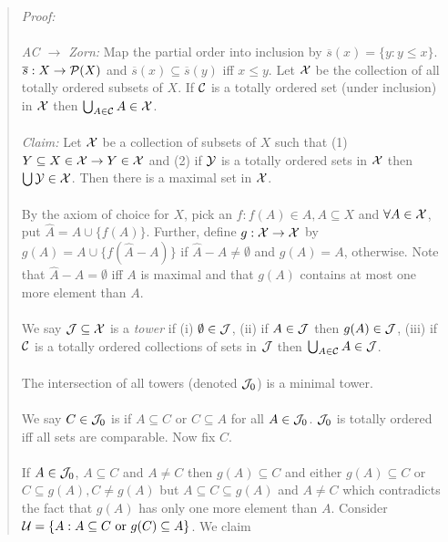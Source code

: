 \begin{quote}
\emph{Proof:}
\\
\\
\emph{AC $\rightarrow$ Zorn:}  Map the partial order into inclusion by
${\overline s}(x)= \{ y: y \leq x \}$.  ${\overline s}: X \rightarrow {\cal P}(X)$ and
${\overline s}(x) \subseteq {\overline s}(y)$ iff $x \leq y$.  Let ${\cal X}$ be the collection of
all totally ordered subsets of $X$.  If ${\cal C}$ is a totally ordered set (under inclusion) in
${\cal X}$ then $\bigcup_{A \in  {\cal C}} A \in {\cal X}$.
\\
\\
\emph{Claim:} Let ${\cal X}$ be a collection of subsets of $X$ such that (1) 
$Y \subseteq X \in {\cal X} \rightarrow Y \in {\cal X}$ and (2) if ${\cal Y}$ is a totally ordered sets
in ${\cal X}$ then $\bigcup {\cal Y} \in {\cal X}$.  Then there is a maximal set in ${\cal X}$.
\\
\\
By the axiom of choice for $X$, pick an $f: f(A) \in A, A \subseteq X$ and $\forall A \in {\cal X}$,
put $\hat{A}= A \cup \{ f(A) \}$.  Further, define $g: {\cal X} \rightarrow {\cal X}$ by
$g(A)= A \cup \{f(\hat{A}-A) \}$ if $\hat{A} - A \neq \emptyset$ and $g(A)=A$, otherwise.  Note that
$\hat{A}-A = \emptyset$ iff $A$ is maximal and that $g(A)$ contains at most one more element than $A$.
\\
\\
We say ${\cal J} \subseteq  {\cal X}$ is a \emph{tower} if (i) $\emptyset \in {\cal J}$, (ii) if
$A \in {\cal J}$ then $g(A) \in {\cal J}$, (iii) if ${\cal C}$ is a totally ordered collections of sets
in ${\cal J}$ then $\bigcup_{A \in {\cal C}} A \in {\cal J}$.
\\
\\
The intersection of all towers (denoted ${\cal J}_0$) is a minimal tower.
\\
\\
We say $C \in {\cal J}_0$ is if $A \subseteq C$ or $C \subseteq A$ for all $A \in {\cal J}_0$.
${\cal J}_0$ is totally ordered iff all sets are comparable.  Now fix $C$.
\\
\\
If $A \in {\cal J}_0$, $A \subseteq C$ and $A \neq C$ then $g(A) \subseteq C$ and either
$g(A) \subseteq C$ or $C \subseteq g(A), C \neq g(A)$ but $A \subseteq C \subseteq g(A)$ and
$A \neq C$ which contradicts the fact that $g(A)$ has only one more element than $A$.
Consider ${\cal U}= \{ A: A \subseteq C \textnormal{ or } g(C) \subseteq A \}$.  We claim

\end{quote}

